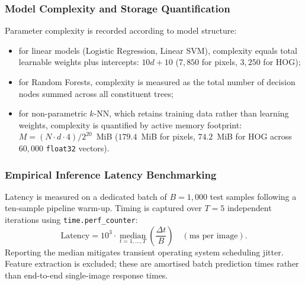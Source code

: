 \documentclass[conference]{IEEEtran}
\newcommand{\code}[1]{\texttt{#1}}
\begin{document}
\subsubsection{Model Complexity and Storage Quantification}
Parameter complexity is recorded according to model structure:
\begin{itemize}
  \item for linear models (Logistic Regression, Linear SVM), complexity
    equals total learnable weights plus intercepts: $10d + 10$ ($7{,}850$
    for pixels, $3{,}250$ for HOG);
  \item for Random Forests, complexity is measured as the total number of
    decision nodes summed across all constituent trees;
  \item for non-parametric $k$-NN, which retains training data rather than
    learning weights, complexity is quantified by active memory footprint:
    $M = (N \cdot d \cdot 4) / 2^{20}$~MiB ($179.4$~MiB for pixels,
    $74.2$~MiB for HOG across $60{,}000$ \code{float32} vectors).
\end{itemize}

\subsubsection{Empirical Inference Latency Benchmarking}
Latency is measured on a dedicated batch of $B = 1{,}000$ test samples
following a ten-sample pipeline warm-up. Timing is captured over $T = 5$
independent iterations using \code{time.perf\_counter}:
\begin{equation}
  \text{Latency} = 10^3 \cdot \operatorname*{median}_{t=1,\dots,T}
  \left(\frac{\Delta t}{B}\right) \quad (\text{ms per image}).
\end{equation}
Reporting the median mitigates transient operating system scheduling jitter.
Feature extraction is excluded; these are amortised batch prediction
times rather than end-to-end single-image response times.
\end{document}
